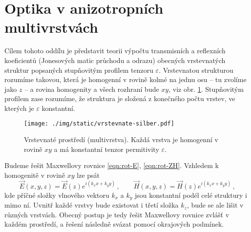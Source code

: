 \section{Optika v anizotropních multivrstvách}
\label{chap:optika-v-multivrstvach}

Cílem tohoto oddílu je představit teorii výpočtu transmisních a reflexních koeficientů (Jonesových matic průchodu a odrazu) obecných vrstevnatých struktur popsaných stupňovitým profilem tenzoru $\varepsilon$.
Vrstevnatou strukturou rozumíme takovou, která je homogenní v rovině kolmé na jednu osu -- tu zvolíme jako $z$ -- a rovina homogenity a všech rozhraní bude $xy$, viz obr. \ref{fig:vrstevnate-prostredi}.
Stupňovitým profilem zase rozumíme, že struktura je složená z konečného počtu vrstev, ve kterých je $\varepsilon$ konstantní.

\begin{figure}[htbp]
    \centering
    \texttt{[image: ./img/static/vrstevnate-silber.pdf]}
    \caption{Vrstevnaté prostředí (multivrstva). Každá vrstva je homogenní v rovině $xy$ a má konstantní tenzor permitivity $\varepsilon$. \cite{silberQuadraticMagnetoopticKerr2019a}}
    \label{fig:vrstevnate-prostredi}
\end{figure}

Budeme řešit Maxwellovy rovnice \eqref{eqn:rot-E}, \eqref{eqn:rot-ZH}.
Vzhledem k homogenitě v rovině $xy$ lze psát
\begin{equation} 
\label{eqn:pricne-vlnove-vektory}
    \vec{E}(x,y,z)=\vec{E}(z) e^{i(k_xx+k_yy)} \,, \qquad \vec{H}(x,y,z)=\vec{H}(z) e^{i(k_xx+k_yy)} \,,
\end{equation}
kde příčné složky vlnového vektoru $k_x$ a $k_y$ jsou konstantní podél celé struktury i mimo ní.
Uvnitř každé vrstvy bude existovat i třetí složka $k_z$, bude se ale lišit v různých vrstvách.
Obecný postup je tedy řešit Maxwellovy rovnice zvlášť v každém prostředí, a řešení následně svázat pomocí okrajových podmínek.
 
